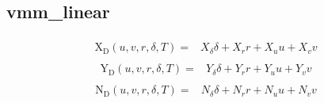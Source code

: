 \documentclass[review]{elsarticle}
\begin{document}
\subsection{vmm\_linear}
\label{\detokenize{appendix_vmms:vmm-linear}}\begin{equation}\label{equation:appendix_vmms:eq_X_D_vmm_linear}
\begin{split}
\begin{align*}
\operatorname{X_{D}}{\left(u,v,r,\delta,T \right)} = & X_{\delta} \delta + X_{r} r + X_{u} u + X_{v} v 
\end{align*}
\end{split}
\end{equation}\begin{equation}\label{equation:appendix_vmms:eq_Y_D_vmm_linear}
\begin{split}
\begin{align*}
\operatorname{Y_{D}}{\left(u,v,r,\delta,T \right)} = & Y_{\delta} \delta + Y_{r} r + Y_{u} u + Y_{v} v 
\end{align*}
\end{split}
\end{equation}\begin{equation}\label{equation:appendix_vmms:eq_N_D_vmm_linear}
\begin{split}
\begin{align*}
\operatorname{N_{D}}{\left(u,v,r,\delta,T \right)} = & N_{\delta} \delta + N_{r} r + N_{u} u + N_{v} v 
\end{align*}
\end{split}
\end{equation}
\end{document}
